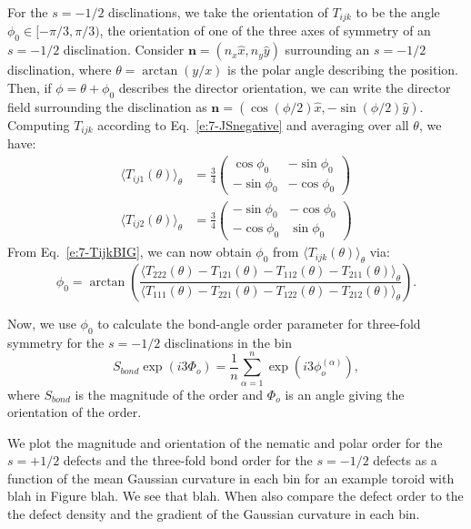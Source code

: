 For the $s = -1/2$ disclinations, we take the orientation of $T_{ijk}$ to be the angle $\phi_0 \in [-\pi/3,\pi/3)$, the orientation of one of the three axes of symmetry of an $s = -1/2$ disclination.
Consider $\mathbf{n} = (n_x \hat{x}, n_y \hat{y})$ surrounding an $s = -1/2$ disclination, where $\theta = \arctan (y/x)$ is the polar angle describing the position.
Then, if $\phi = \theta + \phi_0$ describes the director orientation, we can write the director field surrounding the disclination as $\mathbf{n} = (\cos(\phi/2)\hat{x},-\sin(\phi/2)\hat{y})$.
Computing $T_{ijk}$ according to Eq.~\ref{e:7-JSnegative} and averaging over all $\theta$, we have:
 \begin{align}
   \langle T_{ij1}(\theta) \rangle_{\theta} &=
        \frac{3}{4}\begin{pmatrix}
          \cos \phi_0 & -\sin \phi_0 \\
          -\sin \phi_0 & -\cos \phi_0
        \end{pmatrix}\nonumber \\
  \langle T_{ij2}(\theta) \rangle_{\theta} &=
       \frac{3}{4}\begin{pmatrix}
         -\sin \phi_0 & -\cos \phi_0 \\
         -\cos \phi_0 & \sin \phi_0
       \end{pmatrix}\label{e:7-TijkBIG}
 \end{align}
From Eq.~\ref{e:7-TijkBIG}, we can now obtain $\phi_0$ from $\langle T_{ijk}(\theta) \rangle_{\theta}$ via:
\begin{equation}\label{e:7-phi0Calc}
  \phi_0 = \arctan \left ( \frac{\langle T_{222}(\theta) - T_{121}(\theta) - T_{112}(\theta) - T_{211}(\theta)  \rangle_{\theta}} {\langle T_{111}(\theta) - T_{221}(\theta) - T_{122}(\theta) - T_{212}(\theta)  \rangle_{\theta}} \right).
\end{equation}

Now, we use $\phi_0$ to calculate the bond-angle order parameter for three-fold symmetry for the $s = -1/2$ disclinations in the bin
\begin{equation}\label{e:7-hexorder}
  S_{bond} \exp(i 3 \Phi_o) = \frac{1}{n}\sum\limits_{\alpha = 1}^n \exp (i 3 \phi_o^{(\alpha)}),
\end{equation}
where $S_{bond}$ is the magnitude of the order and $\Phi_o$ is an angle giving the orientation of the order.

We plot the magnitude and orientation of the nematic and polar order for the $s = +1/2$ defects and the three-fold bond order for the $s = -1/2$ defects as a function of the mean Gaussian curvature in each bin for an example toroid with blah in Figure blah.
We see that blah.
When also compare the defect order to the the defect density and the gradient of the Gaussian curvature in each bin.

